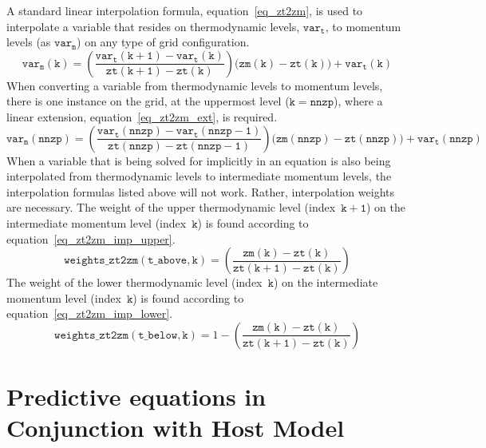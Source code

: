 \documentclass[11pt,fleqn]{article}
\begin{document}
A standard linear interpolation formula, equation~\ref{eq_zt2zm}, is used to 
interpolate a variable that resides on thermodynamic levels, $\mathtt{var_t}$, 
to momentum levels (as $\mathtt{var_m}$) on any type of grid configuration.
\begin{equation}
\label{eq_zt2zm}
\mathtt{var_m(k)}
   = \left( \frac{ \mathtt{var_t(k+1)} - \mathtt{var_t(k)} }
                 { \mathtt{zt(k+1)} - \mathtt{zt(k)} } \right)
     \Big( \mathtt{zm(k)} - \mathtt{zt(k)} \Big)
     + \mathtt{var_t(k)}
\end{equation}
When converting a variable from thermodynamic levels to momentum levels, there
is one instance on the grid, at the uppermost level ($\mathtt{k=nnzp}$), where 
a linear extension, equation~\ref{eq_zt2zm_ext}, is required.
\begin{equation}
\label{eq_zt2zm_ext}
\mathtt{var_m(nnzp)}
   = \left( \frac{ \mathtt{var_t(nnzp)} - \mathtt{var_t(nnzp-1)} }
                 { \mathtt{zt(nnzp)} - \mathtt{zt(nnzp-1)} } \right)
     \Big( \mathtt{zm(nnzp)} - \mathtt{zt(nnzp)} \Big)
     + \mathtt{var_t(nnzp)}
\end{equation}
When a variable that is being solved for implicitly in an equation is also being
interpolated from thermodynamic levels to intermediate momentum levels, the 
interpolation formulas listed above will not work.  Rather, interpolation 
weights are necessary.  The weight of the upper thermodynamic level 
(index~$\mathtt{k+1}$) on the intermediate momentum level (index~$\mathtt{k}$) 
is found according to equation~\ref{eq_zt2zm_imp_upper}.
\begin{equation}
\label{eq_zt2zm_imp_upper}
\mathtt{weights\_zt2zm(t\_above,k)}
   = \left( \frac{ \mathtt{zm(k)} - \mathtt{zt(k)} }
                 { \mathtt{zt(k+1)} - \mathtt{zt(k)} } \right)
\end{equation}
The weight of the lower thermodynamic level (index~$\mathtt{k}$) on the
intermediate momentum level (index~$\mathtt{k}$) is found according to
equation~\ref{eq_zt2zm_imp_lower}.
\begin{equation}
\label{eq_zt2zm_imp_lower}
\mathtt{weights\_zt2zm(t\_below,k)}
   = 1 - \left( \frac{ \mathtt{zm(k)} - \mathtt{zt(k)} }
                     { \mathtt{zt(k+1)} - \mathtt{zt(k)} } \right)
\end{equation}

\pagebreak

\section{Predictive equations in Conjunction with Host Model}
\end{document}
